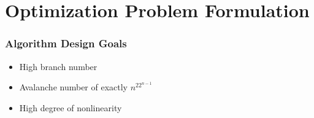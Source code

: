 \documentclass[handout]{beamer}
\newcommand{\field}[1]{\mathbb{#1}} %
\begin{document}

\section{Optimization Problem Formulation}
\begin{frame}
	\frametitle{Algorithm Design Goals}
	\begin{itemize}
		\item High branch number
		\item Avalanche number of exactly $n^22^{n-1}$
		\item High degree of nonlinearity
	\end{itemize}
\end{frame}
\end{document}
